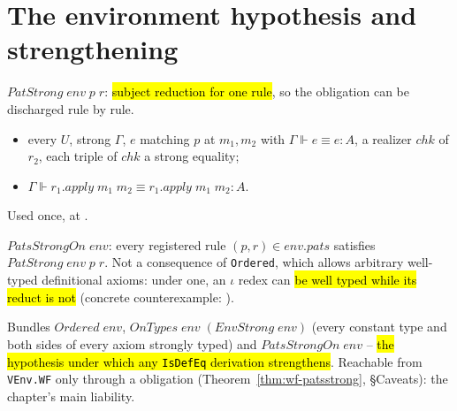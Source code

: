 \section{The environment hypothesis and strengthening}

\begin{definition}
\label{def:patstrong}
\leanok
{}

 $PatStrong\;env\;p\;r$: \hl{subject reduction for one rule}, so the obligation
can be discharged rule by rule.
\begin{itemize}
\item {} every $U$, strong $\Gamma$, $e$ matching $p$ at $m_1,m_2$ with
      $\Gamma\Vdash e\equiv e:A$, a realizer $chk$ of $r_2$, each triple of $chk$ a strong
      equality;
\item {} $\Gamma\Vdash r_1.apply\;m_1\;m_2\equiv r_1.apply\;m_1\;m_2:A$.
\end{itemize}
Used once, at .
\end{definition}

\begin{definition}
\label{def:patsstrongon}
\leanok
{}

 $PatsStrongOn\;env$: every registered rule $(p,r)\in env.pats$ satisfies
$PatStrong\;env\;p\;r$.
 Not a consequence of \texttt{Ordered}, which allows arbitrary well-typed
definitional axioms: under one, an $\iota$ redex can \hl{be well typed while its reduct is
not} (concrete counterexample: ).
\end{definition}

\begin{definition}
\label{struct:orderedstrong}
\leanok
{}

 Bundles $Ordered\;env$, $OnTypes\;env\;(EnvStrong\;env)$ (every constant type
and both sides of every axiom strongly typed) and $PatsStrongOn\;env$ -- \hl{the hypothesis
under which any \texttt{IsDefEq} derivation strengthens}.
 Reachable from \texttt{VEnv.WF} only through a \stSorry{} obligation
(Theorem~\ref{thm:wf-patsstrong}, \S Caveats): the chapter's main liability.
\end{definition}

